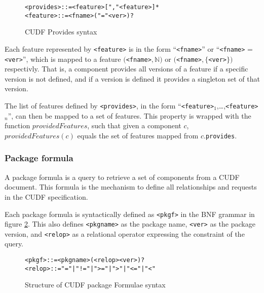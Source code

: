 \begin{figure}[htp] 
\begin{center}
\begin{alltt}
<provides> ::= <feature> ["," <feature>]*
<feature> :: = <fname> ("=" <ver>)?
\end{alltt}
  \caption[Provides syntax]{CUDF Provides syntax}
  \label{formal.cudfprovidessyntax}
\end{center}
\end{figure}

Each feature represented by \verb+<feature>+ is in the form ``\verb+<fname>+'' or  ``\verb+<fname>+ = \verb+<ver>+'', 
which is mapped to a feature $($\verb+<fname>+$,\mathbb{N})$ or $($\verb+<fname>+$,\{$\verb+<ver>+$\})$ respectivly.
That is, a component provides all versions of a feature if a specific version is not defined, and if a version is defined it provides a singleton set of that version.
 
The list of features defined by \verb+<provides>+, in the form ``\verb+<feature>+$_1$,\ldots,\verb+<feature>+$_n$'', can then be mapped to a set of features.
This property is wrapped with the function $providedFeatures$,
such that given a component $c$, $providedFeatures(c)$ equals the set of features mapped from $c$.\verb+provides+.

\subsubsection{Package formula}
A package formula is a query to retrieve a set of components from a CUDF document.
This formula is the mechanism to define all relationships and requests in the CUDF specification.

Each package formula is syntactically defined as \verb+<pkgf>+ in the BNF grammar in figure \ref{formal.cudfpackageformulasyntax}.
This also defines \verb+<pkgname>+ as the package name, \verb+<ver>+ as the package version, and \verb+<relop>+ as a relational operator expressing the constraint of the query.

\begin{figure}[htp] 
\begin{center}
\begin{alltt}
<pkgf> ::= <pkgname> (<relop> <ver>)?
<relop> ::=  "=" | "!=" | ">=" | ">" | "<=" | "<"
\end{alltt}
  \caption[Package Formulae syntax]{Structure of CUDF package Formulae syntax}
  \label{formal.cudfpackageformulasyntax}
\end{center}
\end{figure}

